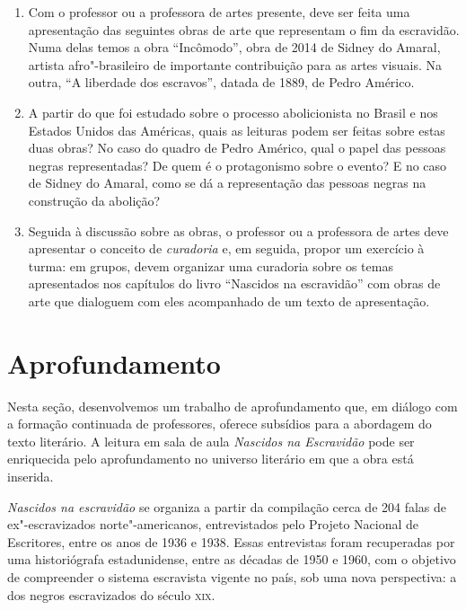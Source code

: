\documentclass[11pt]{extarticle}
\begin{document}
\begin{enumerate}
  \item 
  Com o professor ou a professora de artes presente, deve ser feita uma apresentação
  das seguintes obras de arte que representam o fim da escravidão. 
  Numa delas temos a obra ``Incômodo'', obra de 2014 de Sidney do Amaral, artista afro"-brasileiro
  de importante contribuição para as artes visuais. Na outra, ``A liberdade dos escravos'', datada de
  1889, de Pedro Américo.


  \item
  A partir do que foi estudado sobre o processo abolicionista no Brasil e 
  nos Estados Unidos das
  Américas, quais as leituras podem ser feitas sobre estas duas obras?
  No caso do quadro de Pedro Américo, qual o papel das pessoas negras
  representadas? De quem é o protagonismo sobre o evento? 
  E no caso de Sidney do Amaral, como se dá a representação
  das pessoas negras na construção da abolição?



  \item
  Seguida à discussão sobre as obras, o professor ou a professora de 
  artes deve apresentar o conceito de \textit{curadoria} e, em seguida,
  propor um exercício à turma: em grupos, devem organizar uma 
  curadoria sobre os temas apresentados nos capítulos do livro ``Nascidos
  na escravidão'' com obras de arte que dialoguem com eles 
  acompanhado de um texto de apresentação. 


\end{enumerate}


\section{Aprofundamento}

Nesta seção, desenvolvemos um trabalho de aprofundamento que, em diálogo
com a formação continuada de professores, oferece subsídios para a
abordagem do texto literário. A leitura em sala de aula \emph{Nascidos
na Escravidão} pode ser enriquecida pelo aprofundamento no universo
literário em que a obra está inserida.

\emph{Nascidos na escravidão} se organiza a partir da compilação cerca
de 204 falas de ex"-escravizados norte"-americanos, entrevistados pelo
Projeto Nacional de Escritores, entre os anos de 1936 e 1938. Essas
entrevistas foram recuperadas por uma historiógrafa estadunidense, entre
as décadas de 1950 e 1960, com o objetivo de compreender o sistema
escravista vigente no país, sob uma nova perspectiva: a dos negros
escravizados do século \textsc{xix}.
\end{document}
